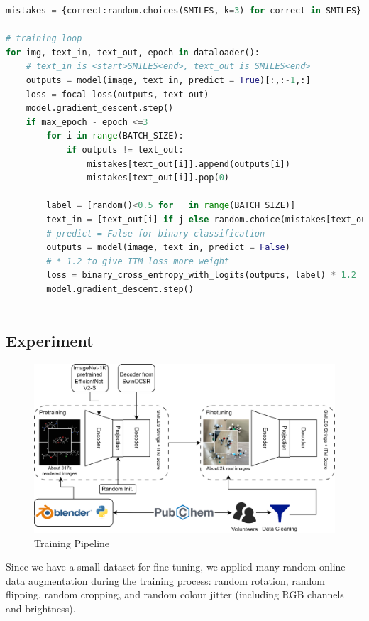 \documentclass[12pt]{article}
\begin{document}
\begin{minipage}{\linewidth}
\tiny

    \begin{lstlisting}[language=Python, caption=Training Process Pseudocode, label=selfnagative]
mistakes = {correct:random.choices(SMILES, k=3) for correct in SMILES}

# training loop
for img, text_in, text_out, epoch in dataloader():
    # text_in is <start>SMILES<end>, text_out is SMILES<end>
    outputs = model(image, text_in, predict = True)[:,:-1,:]
    loss = focal_loss(outputs, text_out)
    model.gradient_descent.step()
    if max_epoch - epoch <=3
        for i in range(BATCH_SIZE):
            if outputs != text_out:
                mistakes[text_out[i]].append(outputs[i])
                mistakes[text_out[i]].pop(0)
        
        label = [random()<0.5 for _ in range(BATCH_SIZE)]
        text_in = [text_out[i] if j else random.choice(mistakes[text_out[i]]) for i, j in enumerate(label)]
        # predict = False for binary classification 
        outputs = model(image, text_in, predict = False)
        # * 1.2 to give ITM loss more weight
        loss = binary_cross_entropy_with_logits(outputs, label) * 1.2 
        model.gradient_descent.step()
    
\end{lstlisting}
\end{minipage}
\subsection{Experiment}
\begin{figure}
    \centering
    \includegraphics[width=0.5\linewidth]{pipeline.png}
    \caption{Training Pipeline}
    \label{fig:pipeline}
\end{figure}
Since we have a small dataset for fine-tuning, we applied many random online data augmentation during the training process: random rotation, random flipping, random cropping,  and random colour jitter (including RGB channels and brightness). 
\end{document}
